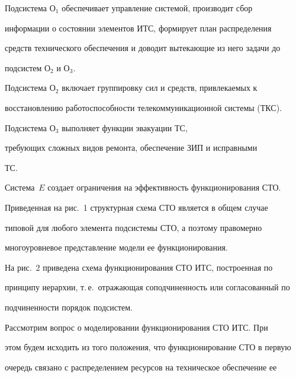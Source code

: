       


  Подсистема О$_1$ обеспечивает управление системой, производит сбор 


информации о состоянии элементов ИТС, формирует план распределения 


средств технического обеспечения и доводит вытекающие из него задачи до 


подсистем О$_2$ и О$_3$.


  


  Подсистема О$_2$ включает группировку сил и средств, привлекаемых к 


восстановлению работоспособности телекоммуникационной системы (ТКС).


  


  Подсистема О$_3$ выполняет функции эвакуации ТС, 


требующих сложных видов ремонта, обеспечение ЗИП и исправными 


ТС.


  


  Система~$E$ создает ограничения на эффективность функционирования СТО. 


  





  


  Приведенная на рис.~1 структурная схема СТО является в общем случае 


типовой для любого элемента подсистемы СТО, а поэтому правомерно 


многоуровневое представление модели ее функционирования.


  


  На рис.~2 приведена схема функционирования СТО ИТС, построенная по 


принципу иерархии, т.\,е.\ отражающая соподчиненность или согласованный по 


подчиненности порядок подсистем.


  


  Рассмотрим вопрос о моделировании функционирования СТО ИТС. При 


этом будем исходить из того положения, что функционирование СТО в первую 


очередь связано с распределением ресурсов на техническое обеспечение ее 


